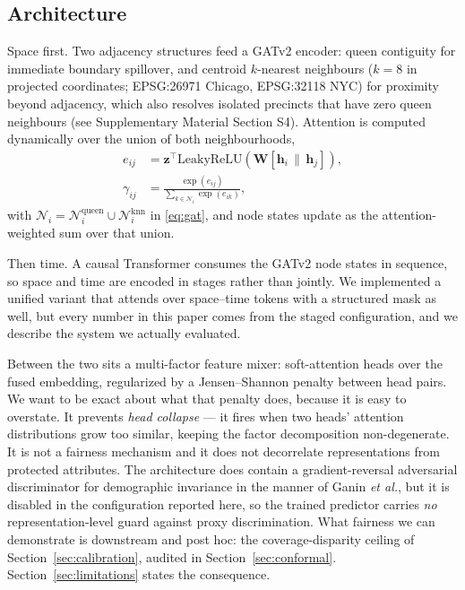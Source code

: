 \documentclass[journal,10pt,twocolumn]{IEEEtran}
\begin{document}
\subsection{Architecture}
Space first. Two adjacency structures feed a GATv2 encoder: queen contiguity for
immediate boundary spillover, and centroid $k$-nearest neighbours ($k=8$ in
projected coordinates; EPSG:26971 Chicago, EPSG:32118 NYC) for proximity beyond
adjacency, which also resolves isolated precincts that have zero queen neighbours
(see Supplementary Material Section S4). Attention is computed dynamically over
the union of both neighbourhoods,
\begin{equation}
\label{eq:gat}
\begin{aligned}
e_{ij} &= \mathbf{z}^{\!\top} \mathrm{LeakyReLU}
          \!\left(\mathbf{W}[\mathbf{h}_i \,\|\, \mathbf{h}_j]\right),\\
\gamma_{ij} &= \frac{\exp(e_{ij})}{\sum_{k \in \mathcal{N}_i}\exp(e_{ik})},
\end{aligned}
\end{equation}
with $\mathcal{N}_i = \mathcal{N}^{\mathrm{queen}}_i \cup
\mathcal{N}^{\mathrm{knn}}_i$ in \eqref{eq:gat}, and node states update as the
attention-weighted sum over that union.

Then time. A causal Transformer consumes the GATv2 node states in sequence, so
space and time are encoded in stages rather than jointly. We implemented a
unified variant that attends over space--time tokens with a structured mask as
well, but every number in this paper comes from the staged configuration, and we
describe the system we actually evaluated.

Between the two sits a multi-factor feature mixer: soft-attention heads over the
fused embedding, regularized by a Jensen--Shannon penalty between head pairs. We
want to be exact about what that penalty does, because it is easy to overstate. It
prevents \emph{head collapse} --- it fires when two heads' attention
distributions grow too similar, keeping the factor decomposition non-degenerate.
It is not a fairness mechanism and it does not decorrelate representations from
protected attributes. The architecture does contain a gradient-reversal
adversarial discriminator for demographic invariance in the manner of Ganin
\emph{et al.}, but it is disabled in the configuration reported here, so the
trained predictor carries \emph{no} representation-level guard against proxy
discrimination. What fairness we can demonstrate is downstream and post hoc: the
coverage-disparity ceiling of Section~\ref{sec:calibration}, audited in
Section~\ref{sec:conformal}. Section~\ref{sec:limitations} states the consequence.
\end{document}
